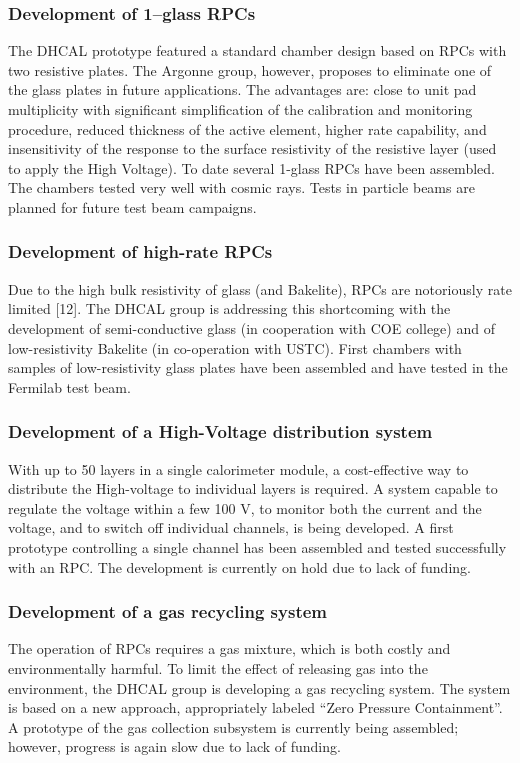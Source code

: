 \subsubsection{Development of 1--glass RPCs}
The DHCAL prototype featured a standard chamber design based on RPCs with two resistive plates. The Argonne group, however, proposes to eliminate one of the glass plates in future applications. The advantages are: close to unit pad multiplicity with significant simplification of the calibration and monitoring procedure, reduced thickness of the active element, higher rate capability, and insensitivity of the response to the surface resistivity of the resistive layer (used to apply the High Voltage). To date several 1-glass RPCs have been assembled. The chambers tested very well with cosmic rays. Tests in particle beams are planned for future test beam campaigns.  
\subsubsection{Development of high-rate RPCs}
Due to the high bulk resistivity of glass (and Bakelite), RPCs are notoriously rate limited [12]. The DHCAL group is addressing this shortcoming with the development of semi-conductive glass (in cooperation with COE college) and of low-resistivity Bakelite (in co-operation with USTC). First chambers with samples of low-resistivity glass plates have been assembled and have tested in the Fermilab test beam.
\subsubsection{Development of a High-Voltage distribution system}
With up to 50 layers in a single calorimeter module, a cost-effective way to distribute the High-voltage to individual layers is required. A system capable to regulate the voltage within a few 100 V, to monitor both the current and the voltage, and to switch off individual channels, is being developed. A first prototype controlling a single channel has been assembled and tested successfully with an RPC. The development is currently on hold due to lack of funding.
\subsubsection{Development of a gas recycling system}
The operation of RPCs requires a gas mixture, which is both costly and environmentally harmful. To limit the effect of releasing gas into the environment, the DHCAL group is developing a gas recycling system. The system is based on a new approach, appropriately labeled ``Zero Pressure Containment''. A prototype of the gas collection subsystem is currently being assembled; however, progress is again slow due to lack of funding. 
